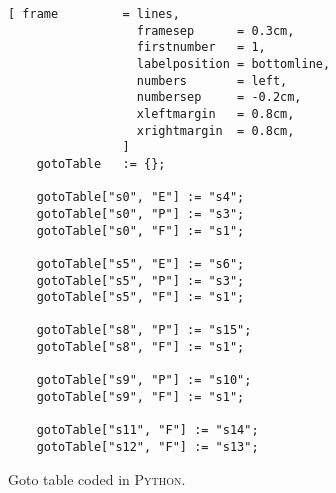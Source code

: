\begin{figure}[!ht]
\centering
\begin{Verbatim}[ frame         = lines, 
                  framesep      = 0.3cm, 
                  firstnumber   = 1,
                  labelposition = bottomline,
                  numbers       = left,
                  numbersep     = -0.2cm,
                  xleftmargin   = 0.8cm,
                  xrightmargin  = 0.8cm,
                ]
    gotoTable   := {};

    gotoTable["s0", "E"] := "s4";
    gotoTable["s0", "P"] := "s3";
    gotoTable["s0", "F"] := "s1";
    
    gotoTable["s5", "E"] := "s6";
    gotoTable["s5", "P"] := "s3";
    gotoTable["s5", "F"] := "s1";
    
    gotoTable["s8", "P"] := "s15";
    gotoTable["s8", "F"] := "s1";
    
    gotoTable["s9", "P"] := "s10";
    gotoTable["s9", "F"] := "s1";
    
    gotoTable["s11", "F"] := "s14";
    gotoTable["s12", "F"] := "s13";
\end{Verbatim}
\vspace*{-0.3cm}
\caption{Goto table coded in \textsc{Python}.}
\label{fig:parse-table.stlx:goto}
\end{figure}


